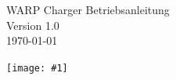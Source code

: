 \documentclass[a4paper,10pt]{article}
\title{}
\author{}
\newcommand{\gfx}[1]{\texttt{[image: \#1]}}
\begin{document}
\pagestyle{empty}
\begin{titlepage}
	\vspace*{-3.08cm}
	\colorbox{boxgray}{}
	\vfill
	\begin{center}
		\Huge
		WARP Charger Betriebsanleitung\\\vspace{1cm}
		\large
		Version 1.0\\\vspace{0.25cm}
		\today
	\end{center}
	\vfill \gfx{./img/resized/warp_perspective_blue_ready}
\end{titlepage}
\newpage
\null
\newpage
\pagestyle{fancy}
\end{document}
